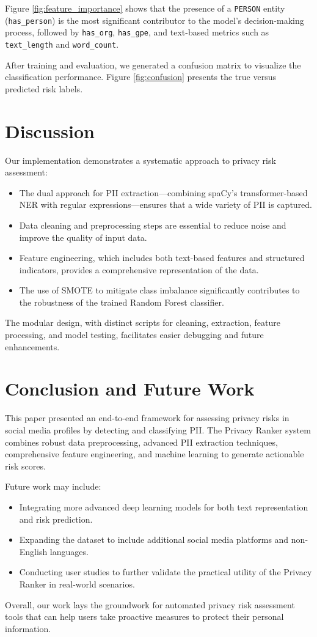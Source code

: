 \documentclass{article}
\begin{document}
Figure \ref{fig:feature_importance} shows that the presence of a \texttt{PERSON} entity (\texttt{has\_person}) is the most significant contributor to the model’s decision-making process, followed by \texttt{has\_org}, \texttt{has\_gpe}, and text-based metrics such as \texttt{text\_length} and \texttt{word\_count}.

After training and evaluation, we generated a confusion matrix to visualize the classification performance. Figure \ref{fig:confusion} presents the true versus predicted risk labels.

\section{Discussion}
Our implementation demonstrates a systematic approach to privacy risk assessment:
\begin{itemize}
    \item The dual approach for PII extraction—combining spaCy's transformer-based NER with regular expressions—ensures that a wide variety of PII is captured.
    \item Data cleaning and preprocessing steps are essential to reduce noise and improve the quality of input data.
    \item Feature engineering, which includes both text-based features and structured indicators, provides a comprehensive representation of the data.
    \item The use of SMOTE to mitigate class imbalance significantly contributes to the robustness of the trained Random Forest classifier.
\end{itemize}
The modular design, with distinct scripts for cleaning, extraction, feature processing, and model testing, facilitates easier debugging and future enhancements.

\section{Conclusion and Future Work}
This paper presented an end-to-end framework for assessing privacy risks in social media profiles by detecting and classifying PII. The Privacy Ranker system combines robust data preprocessing, advanced PII extraction techniques, comprehensive feature engineering, and machine learning to generate actionable risk scores.

Future work may include:
\begin{itemize}
    \item Integrating more advanced deep learning models for both text representation and risk prediction.
    \item Expanding the dataset to include additional social media platforms and non-English languages.
    \item Conducting user studies to further validate the practical utility of the Privacy Ranker in real-world scenarios.
\end{itemize}
Overall, our work lays the groundwork for automated privacy risk assessment tools that can help users take proactive measures to protect their personal information.
\end{document}
